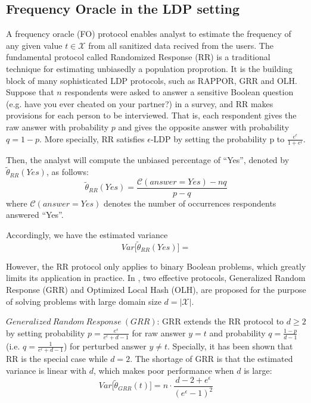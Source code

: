 \documentclass[conference]{IEEEtran}
\begin{document}
\subsection{Frequency Oracle in the LDP setting}
A frequency oracle (FO) protocol enables analyst to estimate the frequency of any given value $t \in \mathcal{X}$ from all sanitized data recived from the users. The fundamental protocol called Randomized Response (RR)\cite{rr} is a traditional technique for estimating unbiasedly a population proprotion. It is the building block of many sophisticated LDP protocols, such as RAPPOR\cite{rappor}, GRR and OLH\cite{a8}. Suppose that $n$ respondents were asked to answer a sensitive Boolean question (e.g. have you ever cheated on your partner?) in a survey, and RR makes provisions for each person to be interviewed. That is, each respondent gives the raw answer with probability $p$ and gives the opposite answer with probability $q = 1-p$. More specially, RR satisfies $\epsilon$-LDP by setting the probability p to $\frac{e^{\epsilon}}{1+e^{\epsilon}}$. 

Then, the analyst will compute the unbiased percentage of ``Yes'', denoted by $\tilde{\theta}_{RR}(Yes)$, as follows:
$$\tilde{\theta}_{RR}(Yes) = \frac{\mathcal{C}(answer=Yes) - nq}{p-q}$$
where $\mathcal{C}(answer=Yes)$ denotes the number of occurrences respondents answered ``Yes''. 

Accordingly, we have the estimated variance
{\color{red}$$Var \big[\tilde{\theta}_{RR}(Yes) \big] = $$}

However, the RR protocol only applies to binary Boolean problems, which greatly limits its application in practice. In \cite{a8}, two effective protocols, Generalized Random Response (GRR) and Optimized Local Hash (OLH), are proposed for the purpose of solving problems with large domain size $d = |\mathcal{X}|$.

$Generalized\ Random\ Response\ (GRR)$\cite{a8}: GRR extends the RR protocol to $d \geq 2$ by setting probability $p = \frac{e^{\epsilon}}{e^{\epsilon} + d - 1}$ for raw answer $y = t$ and probability $q = \frac{1-p}{d-1}$ (i.e. $q =\frac{1}{e^{\epsilon} + d - 1}$) for perturbed answer $y \neq t$. Specially, it has been shown that RR is the special case while $d = 2$. The shortage of GRR is that the estimated variance is linear with $d$, which makes poor performance when $d$ is large: 
\begin{equation}
Var\big[\tilde{\theta}_{GRR}(t)\big] = n \cdot \frac{d - 2+e^{\epsilon}}{(e^{\epsilon}-1)^2} 
\label{grr variance}
\end{equation}
\end{document}
